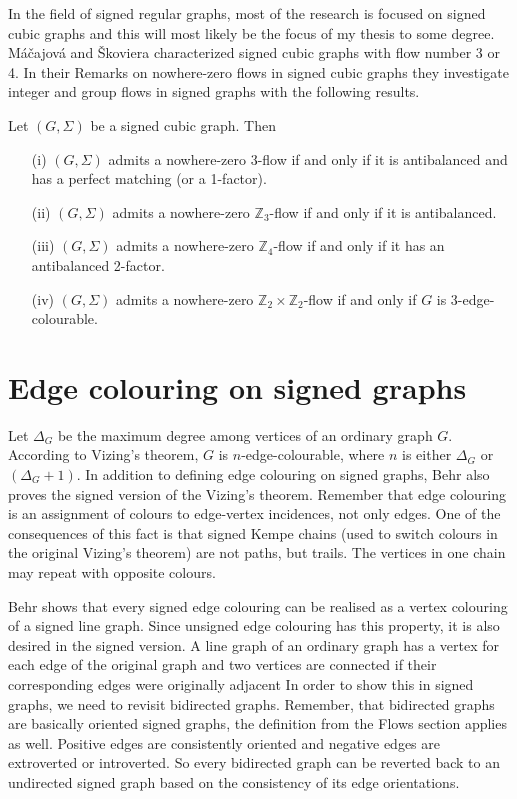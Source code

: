 In the field of signed regular graphs, most of the research is focused on signed cubic graphs and this will most likely be
the focus of my thesis to some degree. Máčajová and Škoviera
characterized signed cubic graphs with flow number 3 or 4. In their Remarks on nowhere-zero flows in signed cubic graphs\cite{cubic-signed-graphs}
they investigate integer and group flows in signed graphs with the following results.

\begin{theorem}
    Let $(G, \Sigma)$ be a signed cubic graph. Then

    \begin{enumerate}
        \item [(i)] $(G, \Sigma)$ admits a nowhere-zero 3-flow if and only if it is antibalanced and has a perfect matching (or a 1-factor).
        \item [(ii)] $(G, \Sigma)$ admits a nowhere-zero $\mathbb{Z}_3$-flow if and only if it is antibalanced.
        \item [(iii)] $(G, \Sigma)$ admits a nowhere-zero $\mathbb{Z}_4$-flow if and only if it has an antibalanced 2-factor.
        \item [(iv)] $(G, \Sigma)$ admits a nowhere-zero $\mathbb{Z}_2 \times \mathbb{Z}_2$-flow if and only if $G$ is 3-edge-colourable.
    \end{enumerate}
\end{theorem}

\section{Edge colouring on signed graphs}

Let $\Delta _G$ be the maximum degree among vertices of an ordinary graph $G$. According to Vizing's theorem, $G$ is $n$-edge-colourable, where $n$ is either $\Delta _G$
or $(\Delta _G + 1)$. In addition to defining edge colouring on signed graphs, Behr also proves the signed version of the Vizing's theorem.
Remember that edge colouring is an assignment of colours to edge-vertex incidences, not only edges. One of the consequences of this fact
is that signed Kempe chains (used to switch colours in the original Vizing's theorem) are not paths, but trails. The vertices in one chain may
repeat with opposite colours.

Behr shows that every signed edge colouring can be realised as a vertex colouring of a signed line graph.
Since unsigned edge colouring has this property, it is also desired in the signed version.
A line graph of an ordinary graph has a vertex for each edge of the original graph and two vertices are connected if their corresponding edges were originally adjacent
In order to show this in signed graphs, we need to revisit bidirected graphs. Remember, that bidirected graphs are basically oriented signed graphs, the definition from the Flows section applies as well.
Positive edges are consistently oriented and negative edges are extroverted or introverted.
So every bidirected graph can be reverted back to an undirected signed graph based on the consistency of its edge orientations.

